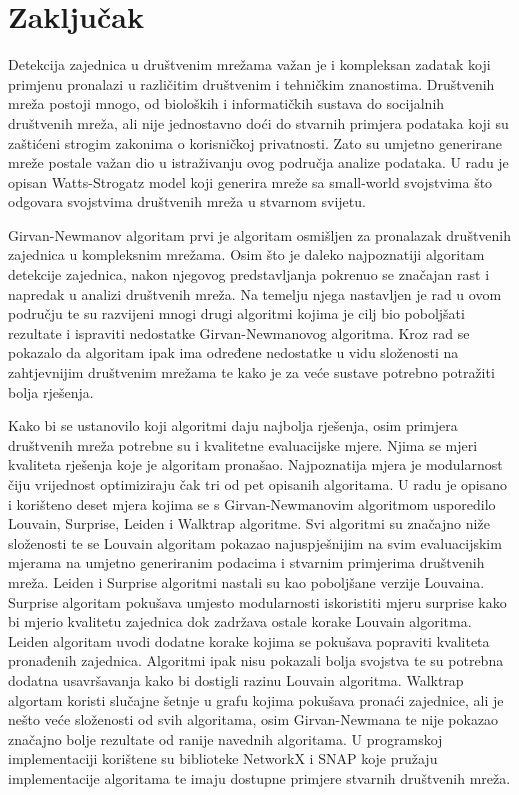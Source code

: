 \documentclass[times, utf8, diplomski]{fer}
\begin{document}
%
\chapter{Zaključak}

Detekcija zajednica u društvenim mrežama važan je i kompleksan zadatak koji primjenu pronalazi u različitim društvenim i tehničkim znanostima. Društvenih mreža postoji mnogo, od bioloških i informatičkih sustava do socijalnih društvenih mreža, ali nije jednostavno doći do stvarnih primjera podataka koji su zaštićeni strogim zakonima o korisničkoj privatnosti. Zato su umjetno generirane mreže postale važan dio u istraživanju ovog područja analize podataka. U radu je opisan Watts-Strogatz model koji generira mreže sa small-world svojstvima što odgovara svojstvima društvenih mreža u stvarnom svijetu.

Girvan-Newmanov algoritam prvi je algoritam osmišljen za pronalazak društvenih zajednica u kompleksnim mrežama. Osim što je daleko najpoznatiji algoritam detekcije zajednica, nakon njegovog predstavljanja pokrenuo se značajan rast i napredak u analizi društvenih mreža. Na temelju njega nastavljen je rad u ovom području te su razvijeni mnogi drugi algoritmi kojima je cilj bio poboljšati rezultate i ispraviti nedostatke Girvan-Newmanovog algoritma. Kroz rad se pokazalo da algoritam ipak ima određene nedostatke u vidu složenosti na zahtjevnijim društvenim mrežama te kako je za veće sustave potrebno potražiti bolja rješenja.

Kako bi se ustanovilo koji algoritmi daju najbolja rješenja, osim primjera društvenih mreža potrebne su i kvalitetne evaluacijske mjere. Njima se mjeri kvaliteta rješenja koje je algoritam pronašao. Najpoznatija mjera je modularnost čiju vrijednost optimiziraju čak tri od pet opisanih algoritama. U radu je opisano i korišteno deset mjera kojima se s Girvan-Newmanovim algoritmom usporedilo Louvain, Surprise, Leiden i Walktrap algoritme. Svi algoritmi su značajno niže složenosti te se Louvain algoritam pokazao najuspješnijim na svim evaluacijskim mjerama na umjetno generiranim podacima i stvarnim primjerima društvenih mreža. Leiden i Surprise algoritmi nastali su kao poboljšane verzije Louvaina. Surprise algoritam pokušava umjesto modularnosti iskoristiti mjeru surprise kako bi mjerio kvalitetu zajednica dok zadržava ostale korake Louvain algoritma. Leiden algoritam uvodi dodatne korake kojima se pokušava popraviti kvaliteta pronađenih zajednica. Algoritmi ipak nisu pokazali bolja svojstva te su potrebna dodatna usavršavanja kako bi dostigli razinu Louvain algoritma. Walktrap algortam koristi slučajne šetnje u grafu kojima pokušava pronaći zajednice, ali je nešto veće složenosti od svih algoritama, osim Girvan-Newmana te nije pokazao značajno bolje rezultate od ranije navednih algoritama. U programskoj implementaciji korištene su biblioteke NetworkX i SNAP koje pružaju implementacije algoritama te imaju dostupne primjere stvarnih društvenih mreža.
\end{document}

